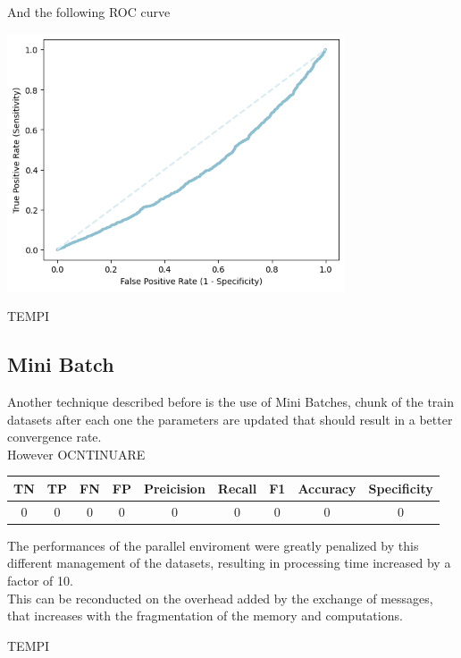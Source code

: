 \documentclass[
	letterpaper, %
	10pt, %
]{class}
\begin{document}
And the following ROC curve

\begin{center}
    \includegraphics[width=10cm]{../images/parallel_roc.png}
\end{center}

TEMPI

\subsection{Mini Batch}

Another technique described before is the use of Mini Batches, chunk of the train datasets after each one the parameters are updated that should result in a better convergence rate.\\
However OCNTINUARE

\begin{center}
    \begin{tabular}{ |c|c|c|c|c|c|c|c|c| }
        \hline
        TN & TP & FN & FP & Preicision & Recall & F1 & Accuracy & Specificity \\
        \hline
        0  & 0  & 0  & 0  & 0          & 0      & 0  & 0        & 0           \\
        \hline
    \end{tabular}
\end{center}

The performances of the parallel enviroment were greatly penalized by this different management of the datasets, resulting in processing time increased by a factor of 10.\\
This can be reconducted on the overhead added by the exchange of messages, that increases with the fragmentation of the memory and computations.

TEMPI
\end{document}
